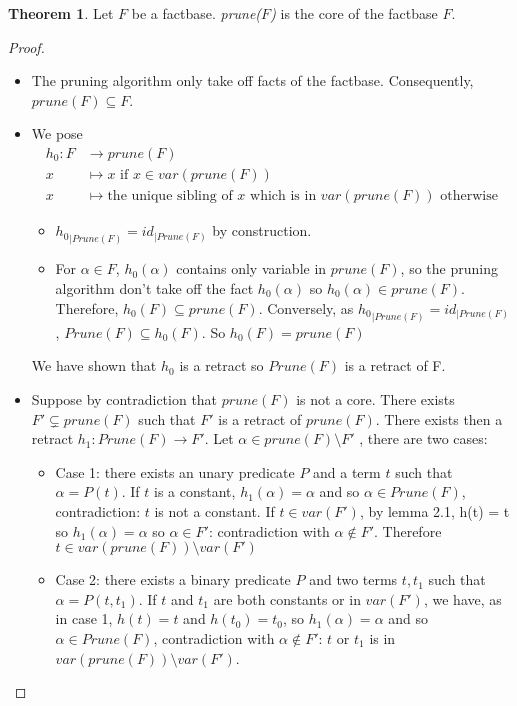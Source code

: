 \documentclass{article}
\theoremstyle{definition}
\newtheorem{theorem}{Theorem}[section]
\theoremstyle{remark}
\begin{document}
\begin{theorem} 
Let $F$ be a factbase. \emph{prune($F$)} is the core of the factbase $F$.
\end{theorem}

\begin{proof}
\begin{itemize}
\item The pruning algorithm only take off facts of the factbase. Consequently, $prune(F) \subseteq F$.
\item We pose 
\begin{align*}
h_0:F &\to prune(F)\\
x &\mapsto x \text{ if }x \in var(prune(F))\\
x &\mapsto \text{the unique sibling of }x\text{ which is in } var(prune(F))\text{ otherwise}
\end{align*}
\begin{itemize}
\item ${h_0}_{|Prune(F)}=id_{|Prune(F)}$ by construction.
\item For $\alpha \in F$, $h_0(\alpha)$ contains only variable in $prune(F)$, so the pruning algorithm don't take off the fact $h_0(\alpha)$ so $h_0(\alpha) \in prune(F)$. Therefore, $h_0(F) \subseteq prune(F)$. Conversely, as ${h_0}_{|Prune(F)}=id_{|Prune(F)}$, $Prune(F) \subseteq h_0(F)$. So $h_0(F) = prune(F)$
\end{itemize}
We have shown that $h_0$ is a retract so $Prune(F)$ is a retract of F.
\item Suppose by contradiction that $prune(F)$ is not a core. There exists $F' \subsetneq prune(F)$ such that $F'$ is a retract of $prune(F)$. There exists then a retract $h_1: Prune(F) \to F'$.  Let $\alpha \in prune(F)\setminus F'$ , there are two cases:
\begin{itemize}
\item Case 1: there exists an unary predicate $P$ and a term $t$ such that $\alpha = P(t)$. If $t$ is a constant, $h_1(\alpha) = \alpha$ and so $\alpha \in Prune(F)$, contradiction: $t$ is not a constant. If $t \in var(F')$, by lemma 2.1, h(t) = t so $h_1(\alpha) = \alpha$ so $\alpha \in F'$: contradiction with $\alpha \notin F'$. Therefore $t \in var(prune(F))\setminus var(F')$
\item Case 2: there exists a binary predicate $P$ and two terms $t,t_1$ such that $\alpha = P(t,t_1)$. If $t$ and $t_1$ are both constants or in $var(F')$, we have, as in case 1, $h(t) = t$ and $h(t_0) = t_0$, so $h_1(\alpha) = \alpha$ and so $\alpha \in Prune(F)$, contradiction with $\alpha \notin F'$: $t$ or $t_1$ is in $var(prune(F))\setminus var(F')$.

\end{itemize}
\end{itemize}
\end{proof}
\end{document}
